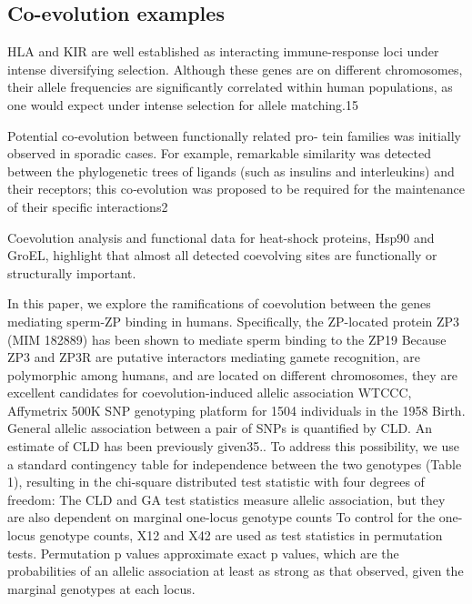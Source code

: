 \subsection{Co-evolution examples}
HLA and KIR are well established as interacting immune-response loci under intense diversifying selection. Although these genes are on different chromosomes, their allele frequencies are significantly correlated within human populations, as one would expect under intense selection for allele matching.15 \cite{rohlfs2010detecting}

Potential co‐evolution between functionally related pro‐ tein families was initially observed in sporadic cases. For example, remarkable similarity was detected between the phylogenetic trees of ligands (such as insulins and interleukins) and their receptors; this co‐evolution was proposed to be required for the maintenance of their specific interactions2 \cite{de2013emerging}

Coevolution analysis and functional data for heat-shock proteins, Hsp90 and GroEL, highlight that almost all detected coevolving sites are functionally or structurally important. \cite{fares2006novel}

In this paper, we explore the ramifications of coevolution between the genes mediating sperm-ZP binding in humans. Specifically, the ZP-located protein ZP3 (MIM 182889) has been shown to mediate sperm binding to the ZP19  \cite{rohlfs2010detecting}
Because ZP3 and ZP3R are putative interactors mediating gamete recognition, are polymorphic among humans, and are located on different chromosomes, they are excellent candidates for coevolution-induced allelic association \cite{rohlfs2010detecting}
WTCCC, Affymetrix 500K SNP genotyping platform for 1504 individuals in the 1958 Birth. \cite{rohlfs2010detecting}
General allelic association between a pair of SNPs is quantified by CLD. An estimate of CLD has been previously given35.. \cite{rohlfs2010detecting}
To address this possibility, we use a standard contingency table for independence between the two genotypes (Table 1), resulting in the chi-square distributed test statistic with four degrees of freedom: \cite{rohlfs2010detecting}
The CLD and GA test statistics measure allelic association, but they are also dependent on marginal one-locus genotype counts \cite{rohlfs2010detecting}
To control for the one-locus genotype counts, X12 and X42 are used as test statistics in permutation tests.  \cite{rohlfs2010detecting}
Permutation p values approximate exact p values, which are the probabilities of an allelic association at least as strong as that observed, given the marginal genotypes at each locus.  \cite{rohlfs2010detecting}

